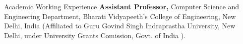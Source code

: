 \begin{rubric}{Academic Working Experience}
		\textbf{Assistant Professor,} Computer Science and Engineering Department, Bharati Vidyapeeth's College of Engineering, New Delhi, India (Affiliated to Guru Govind Singh Indraprastha University, New Delhi, under University Grants Comission, Govt. of India ).
	
	\end{rubric}